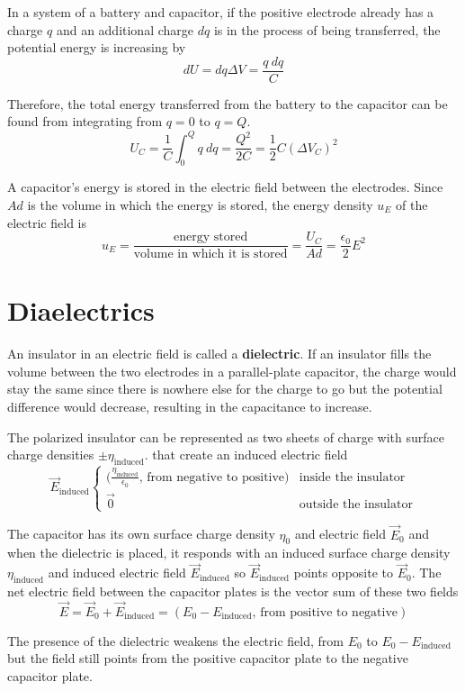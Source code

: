 \documentclass{article}
\begin{document}
In a system of a battery and capacitor, if the positive electrode already has a charge $q$ and an
additional charge $dq$ is in the process of being transferred, the potential energy is increasing
by
\[dU = dq\Delta V=\frac{q\: dq}{C}\]

Therefore, the total energy transferred from the battery to the capacitor can be found from
integrating from $q=0$ to $q=Q$.
\[U_C=\frac{1}{C}\int_{0}^{Q}q\: dq=\frac{Q^2}{2C}=\frac{1}{2}C(\Delta V_C)^2\]

A capacitor's energy is stored in the electric field between the electrodes. Since $Ad$ is the
volume in which the energy is stored, the energy density $u_E$ of the electric field is
\[u_E=\frac{\text{energy stored}}{\text{volume in which it is stored}}=\frac{U_C}{Ad}=
\frac{\epsilon_0}{2}E^2\]
\section*{Diaelectrics}

An insulator in an electric field is called a \textbf{dielectric}. If an insulator fills the volume
between the two electrodes in a parallel-plate capacitor, the charge would stay the same since
there is nowhere else for the charge to go but the potential difference would decrease, resulting
in the capacitance to increase.
\newline

The polarized insulator can be represented as two sheets of charge with surface charge densities
$\pm \eta_\text{induced}$. that create an induced electric field
\[\vec{E}_\text{induced}\begin{cases}
    \Big(\frac{\eta_\text{induced}}{\epsilon_0}\text{, from negative to positive}\Big) &
    \text{inside the insulator} \\
    \vec{0} & \text{outside the insulator}
\end{cases}\]

The capacitor has its own surface charge density $\eta_0$ and electric field $\vec{E}_0$ and when
the dielectric is placed, it responds with an induced surface charge density $\eta_\text{induced}$
and induced electric field $\vec{E}_\text{induced}$ so $\vec{E}_\text{induced}$ points opposite to
$\vec{E}_0$. The net electric field between the capacitor plates is the vector sum of these two
fields
\[\vec{E}=\vec{E}_0 + \vec{E}_\text{induced} = (E_0-E_\text{induced}
\text{, from positive to negative})\]

The presence of the dielectric weakens the electric field, from $E_0$ to $E_0 - E_\text{induced}$
but the field still points from the positive capacitor plate to the negative capacitor plate.
\newline
\end{document}
